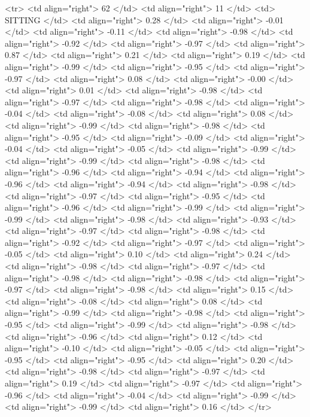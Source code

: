   <tr> <td align="right"> 62 </td> <td align="right">  11 </td> <td> SITTING </td> <td align="right"> 0.28 </td> <td align="right"> -0.01 </td> <td align="right"> -0.11 </td> <td align="right"> -0.98 </td> <td align="right"> -0.92 </td> <td align="right"> -0.97 </td> <td align="right"> 0.87 </td> <td align="right"> 0.21 </td> <td align="right"> 0.19 </td> <td align="right"> -0.99 </td> <td align="right"> -0.95 </td> <td align="right"> -0.97 </td> <td align="right"> 0.08 </td> <td align="right"> -0.00 </td> <td align="right"> 0.01 </td> <td align="right"> -0.98 </td> <td align="right"> -0.97 </td> <td align="right"> -0.98 </td> <td align="right"> -0.04 </td> <td align="right"> -0.08 </td> <td align="right"> 0.08 </td> <td align="right"> -0.99 </td> <td align="right"> -0.98 </td> <td align="right"> -0.95 </td> <td align="right"> -0.09 </td> <td align="right"> -0.04 </td> <td align="right"> -0.05 </td> <td align="right"> -0.99 </td> <td align="right"> -0.99 </td> <td align="right"> -0.98 </td> <td align="right"> -0.96 </td> <td align="right"> -0.94 </td> <td align="right"> -0.96 </td> <td align="right"> -0.94 </td> <td align="right"> -0.98 </td> <td align="right"> -0.97 </td> <td align="right"> -0.95 </td> <td align="right"> -0.96 </td> <td align="right"> -0.99 </td> <td align="right"> -0.99 </td> <td align="right"> -0.98 </td> <td align="right"> -0.93 </td> <td align="right"> -0.97 </td> <td align="right"> -0.98 </td> <td align="right"> -0.92 </td> <td align="right"> -0.97 </td> <td align="right"> -0.05 </td> <td align="right"> 0.10 </td> <td align="right"> 0.24 </td> <td align="right"> -0.98 </td> <td align="right"> -0.97 </td> <td align="right"> -0.98 </td> <td align="right"> -0.98 </td> <td align="right"> -0.97 </td> <td align="right"> -0.98 </td> <td align="right"> 0.15 </td> <td align="right"> -0.08 </td> <td align="right"> 0.08 </td> <td align="right"> -0.99 </td> <td align="right"> -0.98 </td> <td align="right"> -0.95 </td> <td align="right"> -0.99 </td> <td align="right"> -0.98 </td> <td align="right"> -0.96 </td> <td align="right"> 0.12 </td> <td align="right"> -0.10 </td> <td align="right"> -0.05 </td> <td align="right"> -0.95 </td> <td align="right"> -0.95 </td> <td align="right"> 0.20 </td> <td align="right"> -0.98 </td> <td align="right"> -0.97 </td> <td align="right"> 0.19 </td> <td align="right"> -0.97 </td> <td align="right"> -0.96 </td> <td align="right"> -0.04 </td> <td align="right"> -0.99 </td> <td align="right"> -0.99 </td> <td align="right"> 0.16 </td> </tr>
